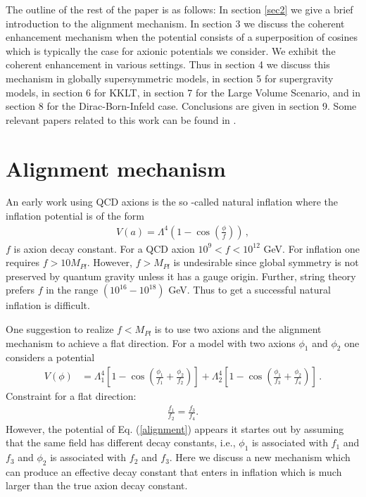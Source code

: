 \documentclass[12pt]{article}
\begin{document}
  The outline of the rest of the paper is as follows: In section \ref{sec2} we give a brief introduction to the alignment mechanism. In section 3
  we discuss the coherent enhancement mechanism when the potential consists of a superposition of cosines which is typically the case 
  for axionic potentials we consider. We exhibit the coherent enhancement in various settings. Thus in section 4 we discuss this mechanism
  in globally supersymmetric models, in section 5 for supergravity models, in section 6 for KKLT, in section 7 for the Large Volume
  Scenario, and in section 8 for the Dirac-Born-Infeld case. Conclusions are given in section 9.
   Some relevant papers related to this work can be found in  \cite{BlancoPillado:2006he,Conlon:2005jm,Ben-Dayan:2014lca,Gao:2014uha}.

%        
  \section{Alignment mechanism \label{sec2}} 

An early work using QCD axions is the so -called natural inflation
 where the inflation potential is of the form   
\begin{align}
V(a) = \Lambda^4 \left(1- \cos(\frac{\phi}{f})\right)\,,
\end{align}
 $f $ is axion decay constant. 
For a QCD axion $10^9 < f  <10^{12}$ GeV. 
 For inflation one requires $f> 10 M_{Pl}$. However, 
$f>M_{Pl}$ is undesirable since  global symmetry is not preserved  by quantum gravity
unless it has a gauge origin.
 Further, string theory prefers $f$ in the range $ (10^{16}-10^{18})$ GeV. 
Thus to get a successful natural inflation is difficult.


One suggestion to realize $f< M_{Pl}$ is to use two axions and the alignment mechanism to achieve a flat direction.
For a model with two axions $\phi_1$ and $\phi_2$ one considers a potential 
\begin{align}
V(\phi)&= \Lambda^4_1 \left[1- \cos\left(\frac{\phi_1}{f_1} + \frac{\phi_2}{f_2}\right)\right]
+ \Lambda^4_2 \left[1- \cos\left(\frac{\phi_1}{f_3} + \frac{\phi_2}{f_4}\right)\right]\,.
\label{alignment}
\end{align}
Constraint for a flat direction: 
\begin{align}
 \frac{f_1}{f_2}= \frac{f_3}{f_4}.
 \end{align}
 However,  the potential of Eq. (\ref{alignment}) appears it startes out  by assuming that the same field 
 has different decay constants, i.e., $\phi_1$ is associated with $f_1$ and $f_3$ and $\phi_2$ is associated with 
 $f_2$ and $f_3$.  Here we discuss a new mechanism which can produce an effective decay constant 
 that enters in inflation which is much larger than  the true axion decay constant.
 
\end{document}
